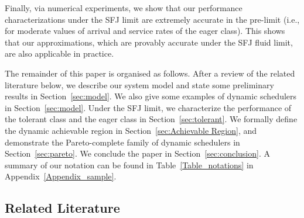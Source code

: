 Finally, via numerical experiments, we show that our performance
characterizations under the SFJ limit are extremely accurate in the
pre-limit (i.e., for moderate values of arrival and service rates of
the eager class). This shows that our approximations, which are
provably accurate under the SFJ fluid limit, are also applicable in
practice.

The remainder of this paper is organised as follows. After a review of
the related literature below, we describe our system model and state
some preliminary results in Section~\ref{sec:model}. We also give some
examples of dynamic schedulers in Section~\ref{sec:model}. Under the
SFJ limit, we characterize the performance of the tolerant class and
the eager class in Section~\ref{sec:tolerant}. We formally define the
dynamic achievable region in Section~\ref{sec:Achievable Region}, and
demonstrate the Pareto-complete family of dynamic schedulers in
Section~\ref{sec:pareto}. We conclude the paper in
Section~\ref{sec:conclusion}. A summary of our notation can be found
in   Table~\ref{Table_notations} in Appendix~\ref{Appendix_sample}.



\subsection*{Related Literature}

